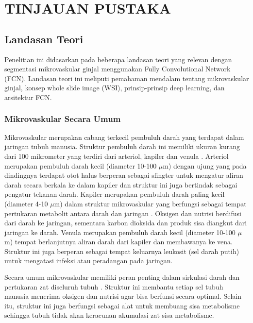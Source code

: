 \chapter{TINJAUAN PUSTAKA}


\section{Landasan Teori}
\noindent Penelitian ini didasarkan pada beberapa landasan teori yang relevan dengan segmentasi mikrovaskular ginjal menggunakan Fully Convolutional Network (FCN). Landasan teori ini meliputi pemahaman mendalam tentang mikrovaskular ginjal, konsep whole slide image (WSI), prinsip-prinsip deep learning, dan arsitektur FCN.

\subsection{Mikrovaskular Secara Umum}
\noindent Mikrovaskular merupakan cabang terkecil pembuluh darah yang terdapat dalam jaringan tubuh manusia. Struktur pembuluh darah ini memiliki ukuran kurang dari 100 mikrometer yang terdiri dari arteriol, kapiler dan venula \cite{mescher_junqueiras_2021,pepe_microvascular_2023}. Arteriol merupakan pembuluh darah kecil (diameter 10-100 $\mu$m) dengan ujung yang pada dindingnya terdapat otot halus berperan sebagai sfingter untuk mengatur aliran darah secara berkala ke dalam kapiler dan struktur ini juga bertindak sebagai pengatur tekanan darah. Kapiler merupakan pembuluh darah paling kecil (diameter 4-10 $\mu$m) dalam struktur mikrovaskular yang berfungsi sebagai tempat pertukaran metabolit antara darah dan jaringan \cite{haffner_emerging_2023}. Oksigen dan nutrisi berdifusi dari darah ke jaringan, sementara karbon dioksida dan produk sisa diangkut dari jaringan ke darah. Venula merupakan pembuluh darah kecil (diameter 10-100 $\mu$m) tempat berlanjutnya aliran darah dari kapiler dan membawanya ke vena. Struktur ini juga berperan sebagai tempat keluarnya leukosit (sel darah putih) untuk mengatasi infeksi atau peradangan pada jaringan.

\noindent Secara umum mikrovaskular memiliki peran penting dalam sirkulasi darah dan pertukaran zat diseluruh tubuh \cite{rusanova_role_2022}. Struktur ini membantu setiap sel tubuh manusia menerima oksigen dan nutrisi agar bisa berfunsi secara optimal. Selain itu, struktur ini juga berfungsi sebagai alat untuk membuang sisa metabolisme sehingga tubuh tidak akan keracunan akumulasi zat sisa metabolisme.

